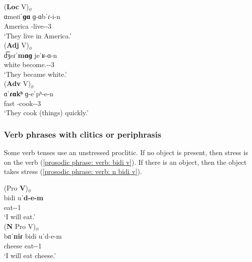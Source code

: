 \begin{exe}
	\ex 
	\begin{xlist}
		\ex \glll (\textbf{Loc} V)$_\phi$ \\
		ɑmeɾiˈ\textbf{ɡɑ} ɡ-ɑbˈɾ-i-n\\ 
		America  {\ind}-live-{\thgloss}-3{\pl} \\
		\trans `They live in  America.' \label{example:inton:phrasa:verb:two:pos:loc}\\ 
		\ex \glll (\textbf{Adj} V)$_\phi$ \\
		d͡ʒeɾˈ\textbf{mɑɡ} jeˈʁ-ɑ-n\\ 
		white  become.{\aorperf}-{\thgloss}-3{\pl} \\
		\trans `They became white.' \label{example:inton:phrasa:verb:two:pos:adj}\\ 
		\ex \glll (\textbf{Adv} V)$_\phi$ \\
		ɑˈ\textbf{ɾɑkʰ} ɡ-eˈpʰ-e-n\\ 
		fast  {\ind}-cook-{\thgloss}-3{\pl} \\
		\trans `They  cook (things) quickly.' \label{example:inton:phrasa:verb:two:pos:adv} \\ 
		
\end{xlist}\end{exe}

\subsubsection{Verb phrases with   clitics or periphrasis}\label{section:intonation:phrase:verb:clitic} 
Some verb tenses use   an unstressed proclitic. If no object is present, then stress is on the verb (\ref{prosodic phrase: verb: bidi v}). If there is an object, then the object takes stress (\ref{prosodic phrase: verb: n bidi v}).  

\begin{exe}
	\ex \begin{xlist}
		\ex \glll (Pro \textbf{V})$_\phi$ \\
		bidi uˈ\textbf{d-e-m} \\ 
		{\fut} eat-{\thgloss}-1{\sg} \\ 
		\trans `I will eat.' \label{prosodic phrase: verb: bidi v}
		\\ 
		\ex \glll (\textbf{N} Pro {V})$_\phi$ \\
		bɑˈ\textbf{niɾ} bidi uˈ{d-e-m} \\ 
		cheese {\fut} eat-{\thgloss}-1{\sg} \\ 
		\trans `I will eat cheese.' \label{prosodic phrase: verb: n bidi v}
		\\ 
	\end{xlist}
\end{exe}


